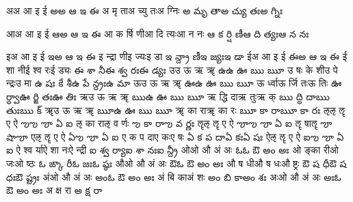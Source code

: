 \documentclass{article}
\begin{document}
\card
{अ}{अ आ इ ई}%
{అ}{అ ఆ ఇ ఈ}
{{अ मृ ता}{अ च्यु तः}{अ ग्निः}}%
{{అ మృ తా}{అ చ్యు తః}{అ గ్నిః}}

\card
{आ}{अ आ इ ई}%
{ఆ}{అ ఆ ఇ ఈ}
{{आ क र्षि णी}{आ दि त्यः}{आ न नः}}%
{{ఆ క ర్షి ణీ}{ఆ ది త్యః}{ఆ న నః}}

\card
{इ}{अ आ इ ई}%
{ఇ}{అ ఆ ఇ ఈ}
{{इ न्द्रा णी}{इ ज्यः}{इ डा}}%
{{ఇ న్ద్రా ణీ}{ఇ జ్యః}{ఇ డా}}
\card
{ई}{अ आ इ ई}%
{ఈ}{అ ఆ ఇ ఈ}
{{ई शा नी}{ई श्व रः}{ई ड्यः}}%
{{ఈ శా నీ}{ఈ శ్వ రః}{ఈ డ్యః}}
\card
{उ}{उ ऊ ऋ ॠ}%
{ఉ}{ఉ ఊ ఋ ౠ}
{{उ षः के शी}{उ पे न्द्रः}{उ मा}}%
{{ఉ షః కే శీ}{ఉ పే న్ద్రః}{ఉ మా}}
\card
{ऊ}{उ ऊ ऋ ॠ}%
{ఊ}{ఉ ఊ ఋ ౠ}
{{ऊ र्ध्वा}{ऊ र्जि तः}{ऊ तिः}}%
{{ఊ ర్ధ్వా}{ఊ ర్జి తః}{ఊ తిః}}
\card
{ऋ}{उ ऊ ऋ ॠ}%
{ఋ}{ఉ ఊ ఋ ౠ}
{{ऋ द्धि दा}{ऋ तुः}{ऋ क्}}%
{{ఋ ద్ధి దా}{ఋ తుః}{ఋ క్}}
\card
{ॠ}{उ ऊ ऋ ॠ}%
{ౠ}{ఉ ఊ ఋ ౠ}
{{ॠ का रा}{ॠ का रः}{ }}%
{{ౠ కా రా}{ౠ కా రః}{ }}
\card
{ऌ}{ऌ ॡ ए ऐ}%
{ఌ}{ఌ ౡ ఏ ఐ}
{{ऌ का रा}{ऌ व र्णः}{ }}%
{{ఌ కా రా}{ఌ వ ర్ణః}{ }}
\card
{ॡ}{ऌ ॡ ए ऐ}%
{ౡ}{ఌ ౡ ఏ ఐ}
{{ॡ षा}{ॡ}{ }}%
{{ౡ షా}{ౡ}{ }}
\card
{ए}{ऌ ॡ ए ऐ}%
{ఏ}{ఌ ౡ ఏ ఐ}
{{ए क प दा}{ए कः}{ए षः}}%
{{ఏ క ప దా}{ఏ కః}{ఏ షః}}
\card
{ऐ}{ऌ ॡ ए ऐ}%
{ఐ}{ఌ ౡ ఏ ఐ}
{{ऐ श्व र्या}{ऐ शा नः}{ऐ न्द्री}}%
{{ఐ శ్వ ర్యా}{ఐ శా నః}{ఐ న్ద్రీ}}
\card
{ओ}{ओ औ अं अः}%
{ఓ}{ఓ ఔ అం అః}
{{ओ ङ्का री}{ओ जः}{ओ ष्ठः}}%
{{ఓ ఙ్కా రీ}{ఓ జః}{ఓ ష్ఠః}}
\card
{औ}{ओ औ अं अः}%
{ఔ}{ఓ ఔ అం అః}
{{औ ष धी}{औ ष धः}{औ ष्ट्रः}}%
{{ఔ ష ధీ}{ఔ ష ధః}{ఔ ష్ట్రః}}
\card
{अं}{ओ औ अं अः}%
{అం}{ఓ ఔ అం అః}
{{अं बि का}{अं शः}{ }}%
{{అం బి కా}{అం శః}{ }}
\card
{अः}{ओ औ अं अः}%
{అః}{ఓ ఔ అం అః}
{{अ क्ष रा}{ }{ }}%
{{అ క్ష రా}{ }{ }}
\end{document}
